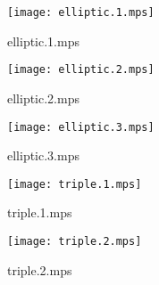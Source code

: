 \documentclass[letterpaper,10pt]{article}
\begin{document}
\begin{figure}
    \centering
    \texttt{[image: elliptic.1.mps]}
    \caption{elliptic.1.mps}
\end{figure}

\begin{figure}
    \centering
    \texttt{[image: elliptic.2.mps]}
    \caption{elliptic.2.mps}
\end{figure}

\begin{figure}
    \centering
    \texttt{[image: elliptic.3.mps]}
    \caption{elliptic.3.mps}
\end{figure}

\begin{figure}
    \centering
    \texttt{[image: triple.1.mps]}
    \caption{triple.1.mps}
\end{figure}

\begin{figure}
    \centering
    \texttt{[image: triple.2.mps]}
    \caption{triple.2.mps}
\end{figure}
\end{document}
